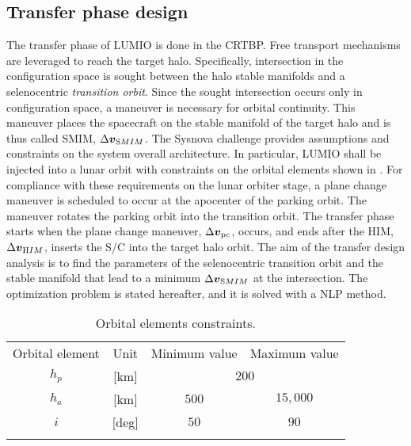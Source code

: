 \begin{figure*}[b!]
\subsection{Transfer phase design}\label{subsec:Transfer phase design}
The transfer phase of LUMIO is done in the CRTBP. Free transport mechanisms are leveraged to reach the target halo. Specifically, intersection in the configuration space is sought between the halo stable manifolds and a selenocentric \emph{transition orbit}. Since the sought intersection occurs only in configuration space, a maneuver is necessary for orbital continuity. This maneuver places the spacecraft on the stable manifold of the target halo and is thus called {SMIM}, $\Delta\boldsymbol{v}_{\textrm SMIM}$. The Sysnova challenge provides assumptions and constraints on the system overall architecture. In particular, LUMIO shall be injected into a lunar orbit with constraints on the orbital elements shown in . For compliance with these requirements on the lunar orbiter stage, a plane change maneuver is scheduled to occur at the apocenter of the parking orbit. The maneuver rotates the parking orbit into the transition orbit. The transfer phase starts when the plane change maneuver, $\Delta\boldsymbol{v}_{\textrm pc}$, occurs, and ends after the {HIM}, $\Delta\boldsymbol{v}_{\textrm HIM}$, inserts the {S/C} into the target halo orbit. The aim of the transfer design analysis is to find the parameters of the selenocentric transition orbit and the stable manifold that lead to a minimum $\Delta\boldsymbol{v}_{\textrm SMIM}$ at the intersection. The optimization problem is stated hereafter, and it is solved with a {NLP} method.
%
\begin{table}[b]
	\caption{Orbital elements constraints.}
	\label{tab:OrbitalElementsConstraints}
	\centering
	\begin{tabular}{cccc}
		\TOPlines
		Orbital element & Unit & Minimum value & Maximum value \\
		\MIDline
		$h_p$ & [km] & \multicolumn{2}{c}{$200$} \\
		$h_a$ & [km] & $500$ & $15,000$ \\
		$i$ & [deg] & $50$ & $90$ \\
		\BOTTOMlines
	\end{tabular}
\end{table}
%


\end{figure*}
